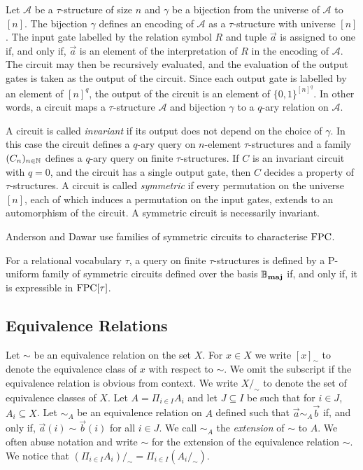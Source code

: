 \documentclass[../paper.tex]{subfiles}
\begin{document}
Let $\mathcal{A}$ be a $\tau$-structure of size $n$ and $\gamma$ be a bijection
from the universe of $\mathcal{A}$ to $[n]$. The bijection $\gamma$ defines an
encoding of $\mathcal{A}$ as a $\tau$-structure with universe $[n]$. The input
gate labelled by the relation symbol $R$ and tuple $\vec{a}$ is assigned to one
if, and only if, $\vec{a}$ is an element of the interpretation of $R$ in the
encoding of $\mathcal{A}$. The circuit may then be recursively evaluated, and
the evaluation of the output gates is taken as the output of the circuit. Since
each output gate is labelled by an element of $[n]^q$, the output of the circuit
is an element of $\{0,1\}^{[n]^q}$. In other words, a circuit maps a
$\tau$-structure $\mathcal{A}$ and bijection $\gamma$ to a $q$-ary
relation on $\mathcal{A}$.

A circuit is called \emph{invariant} if its output does not depend on the choice
of $\gamma$.  In this case the circuit defines a $q$-ary query on $n$-element
$\tau$-structures and a family $(C_n)_{n\in\mathbb{N}}$ defines a $q$-ary
query on finite $\tau$-structures. If $C$ is an invariant circuit with $q = 0$, and the circuit
has a single output gate, then $C$ decides a property of $\tau$-structures. A circuit
is called \emph{symmetric} if every permutation on the universe $[n]$, each of
which induces a permutation on the input gates, extends to an automorphism of
the circuit. A symmetric circuit is necessarily invariant.

Anderson and Dawar use families of symmetric circuits to characterise $\text{\upshape FPC}$.

\begin{thm}
  For a relational vocabulary $\tau$, a query on finite $\tau$-structures is
  defined by a P-uniform family of symmetric circuits defined over the basis
  $\mathbb{B}_{\text{\textbf{maj}}}$ if, and only if, it is expressible in $\text{\upshape FPC}[\tau]$.
\end{thm}

\subsection{Equivalence Relations}
Let $\sim$ be an equivalence relation on the set $X$. For $x \in X$ we write
$[x]_\sim$ to denote the equivalence class of $x$ with respect to $\sim$. We
omit the subscript if the equivalence relation is obvious from context. We write
$X/_{\sim}$ to denote the set of equivalence classes of $X$. Let $A = \Pi_{i \in
  I} A_i$ and let $J \subseteq I$ be such that for $i \in J$, $A_i \subseteq X$.
Let $\sim_A$ be an equivalence relation on $A$ defined such that $\vec{a} \sim_A
\vec{b}$ if, and only if, $\vec{a}(i) \sim \vec{b}(i)$ for all $i \in J$. We call
$\sim_A$ the \emph{extension} of $\sim$ to $A$. We often abuse notation and
write $\sim$ for the extension of the equivalence relation $\sim$. We notice
that $(\Pi_{i \in I} A_i) /_{\sim} = \Pi_{i \in I} (A_i /_\sim)$.
\end{document}
